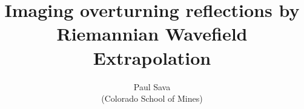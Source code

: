 \title{Imaging overturning reflections by \\ 
Riemannian Wavefield Extrapolation }
\author{Paul Sava \\ (Colorado School of Mines)}

\maketitle
















